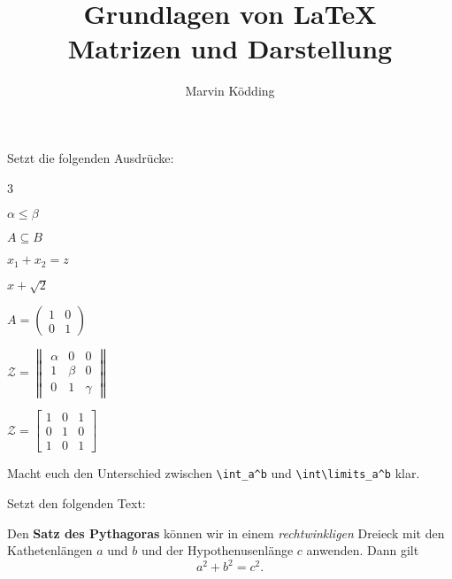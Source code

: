 \documentclass[a4paper, 12pt]{mksheetphhd}
\title{Grundlagen von \LaTeX\\\small Matrizen und Darstellung}
\author{Marvin Ködding}
\begin{document}
	\printtitle
	
	\vspace*{.5cm}
	
	\begin{aufgabe}
		Setzt die folgenden Ausdrücke:
		\begin{enumerate}
		\end{enumerate}
	\end{aufgabe}
	
	\begin{aufgabe}
		Macht euch den Unterschied zwischen \verb+\int_a^b+ und \verb+\int\limits_a^b+ klar.
	\end{aufgabe}
	
	\begin{aufgabe}
		Setzt den folgenden Text:
		
		Den \textbf{Satz des Pythagoras} können wir in einem \textit{rechtwinkligen} Dreieck mit den Kathetenlängen $a$ und $b$ und der Hypothenusenlänge $c$ anwenden. Dann gilt \[a^2+b^2=c^2.\]
	\end{aufgabe}
	
	
\end{document}
